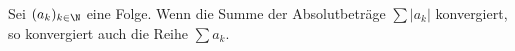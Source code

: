 Sei $(a_k)_{k \in \N}$ eine Folge. Wenn die Summe der Absolutbeträge $\sum |a_k|$ konvergiert, so konvergiert auch die Reihe $\sum a_k$.